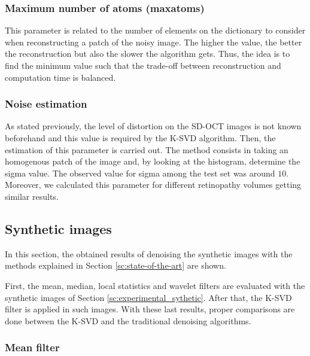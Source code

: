 \subsubsection{Maximum number of atoms (maxatoms)}
This parameter is related to the number of elements on the dictionary to consider when reconstructing a patch of the noisy image. The higher the value, the better the reconstruction but also the slower the algorithm gets. Thus, the idea is to find the minimum value such that the trade-off between reconstruction and computation time is balanced. 
 
\subsubsection{Noise estimation} \label{sc:noise-estimation}
As stated previously, the level of distortion on the SD-OCT images is not known beforehand and this value is required by the K-SVD algorithm. Then, the estimation of this parameter is carried out. The method consists in taking an homogenous patch of the image and, by looking at the histogram, determine the sigma value. The observed value for sigma among the test set was around $10$. Moreover, we calculated this parameter for different retinopathy volumes getting similar results.

\subsection{Synthetic images} \label{sc:results_synthetic}
In this section, the obtained results of denoising the synthetic images with the methods explained in Section \ref{sc:state-of-the-art} are shown. 

First, the mean, median, local statistics and wavelet filters are evaluated with the synthetic images of Section \ref{sc:experimental_sythetic}. After that, the K-SVD filter is applied in such images. With these last results, proper comparisons are done between the K-SVD and the traditional denoising algorithms.

\subsubsection{Mean filter}

